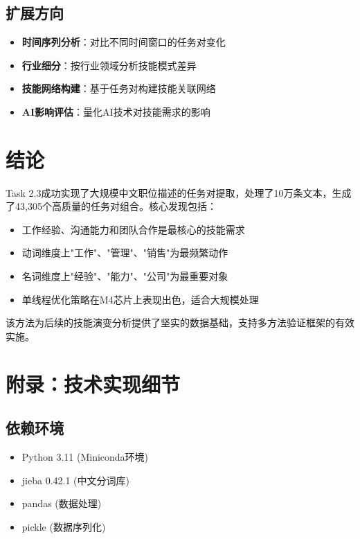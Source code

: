 \documentclass[11pt,a4paper]{article}
\begin{document}
\subsection{扩展方向}

\begin{itemize}
    \item \textbf{时间序列分析}：对比不同时间窗口的任务对变化
    \item \textbf{行业细分}：按行业领域分析技能模式差异
    \item \textbf{技能网络构建}：基于任务对构建技能关联网络
    \item \textbf{AI影响评估}：量化AI技术对技能需求的影响
\end{itemize}

\section{结论}

Task 2.3成功实现了大规模中文职位描述的任务对提取，处理了10万条文本，生成了43,305个高质量的任务对组合。核心发现包括：

\begin{itemize}
    \item 工作经验、沟通能力和团队合作是最核心的技能需求
    \item 动词维度上"工作"、"管理"、"销售"为最频繁动作
    \item 名词维度上"经验"、"能力"、"公司"为最重要对象
    \item 单线程优化策略在M4芯片上表现出色，适合大规模处理
\end{itemize}

该方法为后续的技能演变分析提供了坚实的数据基础，支持多方法验证框架的有效实施。

\section{附录：技术实现细节}

\subsection{依赖环境}

\begin{itemize}
    \item Python 3.11 (Miniconda环境)
    \item jieba 0.42.1 (中文分词库)
    \item pandas (数据处理)
    \item pickle (数据序列化)
\end{itemize}
\end{document}
